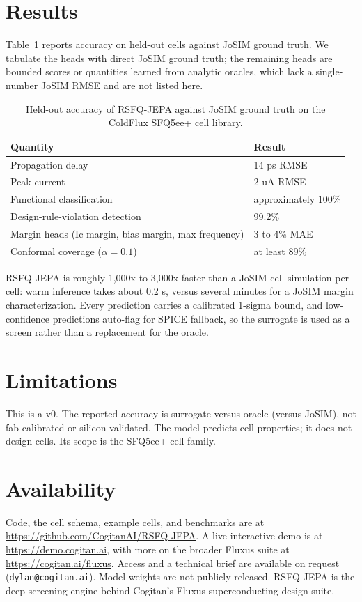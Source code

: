 \documentclass[11pt]{article}
\begin{document}
\section{Results}
Table~\ref{tab:results} reports accuracy on held-out cells against JoSIM ground truth. We tabulate the heads with direct JoSIM ground truth; the remaining heads are bounded scores or quantities learned from analytic oracles, which lack a single-number JoSIM RMSE and are not listed here.

\begin{table}[h]
\centering
\caption{Held-out accuracy of RSFQ-JEPA against JoSIM ground truth on the ColdFlux SFQ5ee+ cell library.}
\label{tab:results}
\begin{tabular}{@{}ll@{}}
\toprule
Quantity & Result \\
\midrule
Propagation delay & 14 ps RMSE \\
Peak current & 2 uA RMSE \\
Functional classification & approximately 100\% \\
Design-rule-violation detection & 99.2\% \\
Margin heads (Ic margin, bias margin, max frequency) & 3 to 4\% MAE \\
Conformal coverage ($\alpha = 0.1$) & at least 89\% \\
\bottomrule
\end{tabular}
\end{table}

RSFQ-JEPA is roughly 1,000x to 3,000x faster than a JoSIM cell simulation per cell: warm inference takes about 0.2 s, versus several minutes for a JoSIM margin characterization. Every prediction carries a calibrated 1-sigma bound, and low-confidence predictions auto-flag for SPICE fallback, so the surrogate is used as a screen rather than a replacement for the oracle.

\section{Limitations}
This is a v0. The reported accuracy is surrogate-versus-oracle (versus JoSIM), not fab-calibrated or silicon-validated. The model predicts cell properties; it does not design cells. Its scope is the SFQ5ee+ cell family.

\section{Availability}
Code, the cell schema, example cells, and benchmarks are at \url{https://github.com/CogitanAI/RSFQ-JEPA}. A live interactive demo is at \url{https://demo.cogitan.ai}, with more on the broader Fluxus suite at \url{https://cogitan.ai/fluxus}. Access and a technical brief are available on request (\texttt{dylan@cogitan.ai}). Model weights are not publicly released. RSFQ-JEPA is the deep-screening engine behind Cogitan's Fluxus superconducting design suite.
\end{document}
